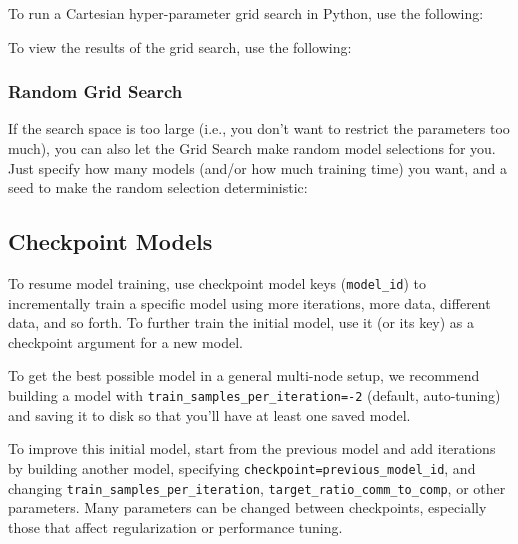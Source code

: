 {{To run a Cartesian hyper-parameter grid search in Python, use the following:

\waterExampleInPython



To view the results of the grid search, use the following: 

\waterExampleInR


\waterExampleInPython


\subsubsection{Random Grid Search}
If the search space is too large (i.e., you don't want to restrict the parameters too much), you can also let the Grid Search make random model selections for you. Just specify how many models (and/or how much training time) you want, and a seed to make the random selection deterministic:

\waterExampleInR


\waterExampleInPython




\subsection{Checkpoint Models}

To resume model training, use checkpoint model keys (\texttt{model\_id}) to incrementally train a specific model using more iterations, more data, different data, and so forth. To further train the initial model, use it (or its key) as a checkpoint argument for a new model.

To get the best possible model in a general multi-node setup, we recommend building a model with \texttt{train\_samples\_per\_iteration=-2} (default, auto-tuning) and saving it to disk so that you’ll have at least one saved model.

To improve this initial model, start from the previous model and add iterations by building another model, specifying \texttt{checkpoint=previous\_model\_id}, and changing \texttt{train\_samples\_per\_iteration}, \texttt{target\_ratio\_comm\_to\_comp},
or other parameters. Many parameters can be changed between checkpoints, especially those that affect regularization or performance tuning.

}}
